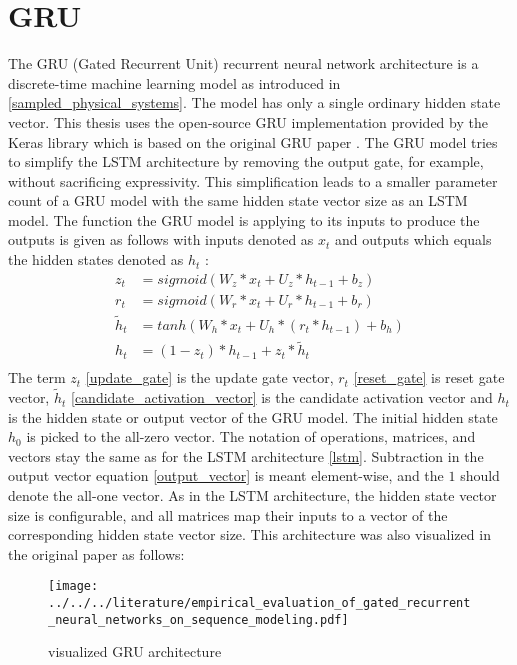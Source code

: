 \documentclass[draft,final]{vutinfth} %
\begin{document}
    \section{GRU} \label{gru}
    The GRU (Gated Recurrent Unit) recurrent neural network architecture is a discrete-time machine learning model as introduced in \ref{sampled_physical_systems}.
    The model has only a single ordinary hidden state vector.
    This thesis uses the open-source GRU implementation provided by the Keras library \cite{Keras} which is based on the original GRU paper \cite{GRU}.
    The GRU model tries to simplify the LSTM architecture by removing the output gate, for example, without sacrificing expressivity.
    This simplification leads to a smaller parameter count of a GRU model with the same hidden state vector size as an LSTM model.
    The function the GRU model is applying to its inputs to produce the outputs is given as follows with inputs denoted as $x_t$ and outputs which equals the hidden states denoted as $h_t$ \cite[p. 4]{GRU}:
    \begin{align}
    \label{update_gate} z_t &= sigmoid(W_z*x_t + U_z*h_{t-1} + b_z) \\
    \label{reset_gate} r_t &= sigmoid(W_r*x_t + U_r*h_{t-1} + b_r) \\
    \label{candidate_activation_vector} \tilde{h}_t &= tanh(W_h*x_t + U_h*(r_t * h_{t-1}) + b_h) \\
    \label{output_vector} h_t &= (1 - z_t) * h_{t-1} + z_t * \tilde{h}_t \\
    \end{align}
    The term $z_t$ \ref{update_gate} is the update gate vector, $r_t$ \ref{reset_gate} is reset gate vector, $\tilde{h}_t$ \ref{candidate_activation_vector} is the candidate activation vector and $h_t$ is the hidden state or output vector of the GRU model.
    The initial hidden state $h_0$ is picked to the all-zero vector.
    The notation of operations, matrices, and vectors stay the same as for the LSTM architecture \ref{lstm}.
    Subtraction in the output vector equation \ref{output_vector} is meant element-wise, and the $1$ should denote the all-one vector.
    As in the LSTM architecture, the hidden state vector size is configurable, and all matrices map their inputs to a vector of the corresponding hidden state vector size.
    This architecture was also visualized in the original paper as follows:
    \begin{figure}[H]
        \centering{}
        \texttt{[image: ../../../literature/empirical\_evaluation\_of\_gated\_recurrent\_neural\_networks\_on\_sequence\_modeling.pdf]}
        \caption{visualized GRU architecture \cite[p. 3]{GRU}}
        \label{fig:gru_vis}
    \end{figure}
\end{document}
